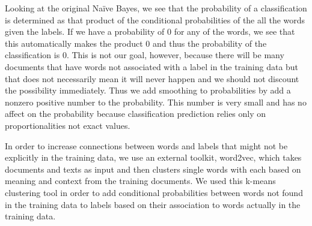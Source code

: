 \documentclass[11pt,letterpaper]{article}
\begin{document}
Looking at the original Na{\"i}ve Bayes, we see that the probability of a classification is determined as that product of the conditional probabilities of the all the words given the labels. If we have a probability of 0 for any of the words, we see that this automatically makes the product 0 and thus the probability of the classification is 0. This is not our goal, however, because there will be many documents that have words not associated with a label in the training data but that does not necessarily mean it will never happen and we should not discount the possibility immediately. Thus we add smoothing to probabilities by add a nonzero positive number to the probability. This number is very small and has no affect on the probability because classification prediction relies only on proportionalities not exact values.

In order to increase connections between words and labels that might not be explicitly in the training data, we use an external toolkit, word2vec, which takes documents and texts as input and then clusters single words with each based on meaning and context from the training documents. We used this k-means clustering tool in order to add conditional probabilities between words not found in the training data to labels based on their association to words actually in the training data. 
\end{document}
